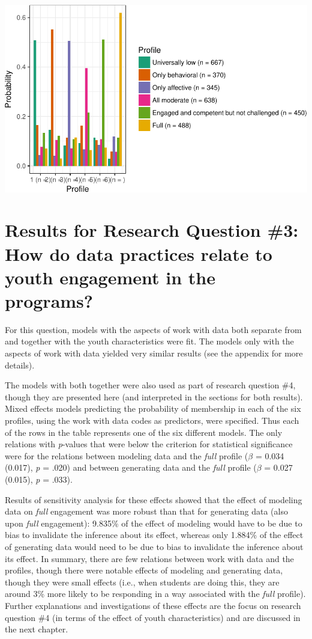 \documentclass[]{msu-thesis}
\theoremstyle{definition}
\theoremstyle{definition}
\theoremstyle{definition}
\theoremstyle{remark}
\begin{document}
\begin{center}\includegraphics[width=0.8\linewidth]{rosenberg-dissertation_files/figure-latex/unnamed-chunk-12-1} \end{center}

\section{Results for Research Question \#3: How do data practices relate
to youth engagement in the
programs?}\label{results-for-research-question-3-how-do-data-practices-relate-to-youth-engagement-in-the-programs}

For this question, models with the aspects of work with data both
separate from and together with the youth characteristics were fit. The
models only with the aspects of work with data yielded very similar
results (see the appendix for more details).

The models with both together were also used as part of research
question \#4, though they are presented here (and interpreted in the
sections for both results). Mixed effects models predicting the
probability of membership in each of the six profiles, using the work
with data codes as predictors, were specified. Thus each of the rows in
the table represents one of the six different models. The only relations
with \emph{p}-values that were below the criterion for statistical
significance were for the relations between modeling data and the
\emph{full} profile (\(\beta\) = 0.034 (0.017), \emph{p} = .020) and
between generating data and the \emph{full} profile (\(\beta\) = 0.027
(0.015), \emph{p} = .033).

Results of sensitivity analysis for these effects showed that the effect
of modeling data on \emph{full} engagement was more robust than that for
generating data (also upon \emph{full} engagement): 9.835\% of the
effect of modeling would have to be due to bias to invalidate the
inference about its effect, whereas only 1.884\% of the effect of
generating data would need to be due to bias to invalidate the inference
about its effect. In summary, there are few relations between work with
data and the profiles, though there were notable effects of modeling and
generating data, though they were small effects (i.e., when students are
doing this, they are around 3\% more likely to be responding in a way
associated with the \emph{full} profile). Further explanations and
investigations of these effects are the focus on research question \#4
(in terms of the effect of youth characteristics) and are discussed in
the next chapter.
\end{document}
